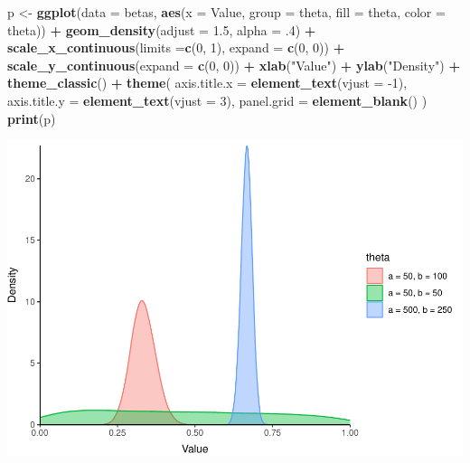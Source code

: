 \documentclass[
]{book}
\newenvironment{Shaded}{\begin{snugshade}}{\end{snugshade}}
\newcommand{\DataTypeTok}[1]{\textcolor[rgb]{0.13,0.29,0.53}{#1}}
\newcommand{\DecValTok}[1]{\textcolor[rgb]{0.00,0.00,0.81}{#1}}
\newcommand{\FloatTok}[1]{\textcolor[rgb]{0.00,0.00,0.81}{#1}}
\newcommand{\KeywordTok}[1]{\textcolor[rgb]{0.13,0.29,0.53}{\textbf{#1}}}
\newcommand{\NormalTok}[1]{#1}
\newcommand{\OperatorTok}[1]{\textcolor[rgb]{0.81,0.36,0.00}{\textbf{#1}}}
\newcommand{\StringTok}[1]{\textcolor[rgb]{0.31,0.60,0.02}{#1}}
\begin{document}
\begin{Shaded}
\begin{Highlighting}[]
\NormalTok{p <-}\StringTok{ }\KeywordTok{ggplot}\NormalTok{(}\DataTypeTok{data =}\NormalTok{ betas,}
            \KeywordTok{aes}\NormalTok{(}\DataTypeTok{x =}\NormalTok{ Value, }\DataTypeTok{group =}\NormalTok{ theta, }\DataTypeTok{fill =}\NormalTok{ theta, }\DataTypeTok{color =}\NormalTok{ theta)) }\OperatorTok{+}
\StringTok{  }\KeywordTok{geom_density}\NormalTok{(}\DataTypeTok{adjust =} \FloatTok{1.5}\NormalTok{, }\DataTypeTok{alpha =} \FloatTok{.4}\NormalTok{) }\OperatorTok{+}
\StringTok{  }\KeywordTok{scale_x_continuous}\NormalTok{(}\DataTypeTok{limits =}\KeywordTok{c}\NormalTok{(}\DecValTok{0}\NormalTok{, }\DecValTok{1}\NormalTok{), }\DataTypeTok{expand =} \KeywordTok{c}\NormalTok{(}\DecValTok{0}\NormalTok{, }\DecValTok{0}\NormalTok{)) }\OperatorTok{+}\StringTok{ }
\StringTok{  }\KeywordTok{scale_y_continuous}\NormalTok{(}\DataTypeTok{expand =} \KeywordTok{c}\NormalTok{(}\DecValTok{0}\NormalTok{, }\DecValTok{0}\NormalTok{)) }\OperatorTok{+}\StringTok{ }
\StringTok{  }\KeywordTok{xlab}\NormalTok{(}\StringTok{"Value"}\NormalTok{) }\OperatorTok{+}
\StringTok{  }\KeywordTok{ylab}\NormalTok{(}\StringTok{"Density"}\NormalTok{) }\OperatorTok{+}
\StringTok{  }\KeywordTok{theme_classic}\NormalTok{() }\OperatorTok{+}
\StringTok{  }\KeywordTok{theme}\NormalTok{(}
    \DataTypeTok{axis.title.x =} \KeywordTok{element_text}\NormalTok{(}\DataTypeTok{vjust =} \DecValTok{-1}\NormalTok{),}
    \DataTypeTok{axis.title.y =} \KeywordTok{element_text}\NormalTok{(}\DataTypeTok{vjust =} \DecValTok{3}\NormalTok{),}
    \DataTypeTok{panel.grid =} \KeywordTok{element_blank}\NormalTok{()}
\NormalTok{  )}
\KeywordTok{print}\NormalTok{(p)}
\end{Highlighting}
\end{Shaded}

\includegraphics{worstr_files/figure-latex/unnamed-chunk-125-1.pdf}
\end{document}
